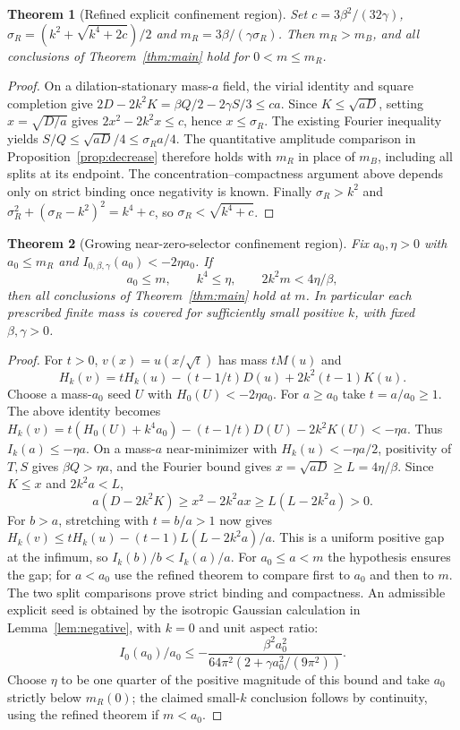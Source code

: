 \documentclass[11pt]{article}
\numberwithin{equation}{section}
\newtheorem{theorem}{Theorem}[section]
\theoremstyle{remark}
\begin{document}
\begin{theorem}[Refined explicit confinement region]
Set $c=3\beta^2/(32\gamma)$,
$\sigma_R=(k^2+\sqrt{k^4+2c})/2$ and
$m_R=3\beta/(\gamma\sigma_R)$. Then $m_R>m_B$, and all conclusions of
Theorem~\ref{thm:main} hold for $0<m\le m_R$.
\end{theorem}
\begin{proof}
On a dilation-stationary mass-$a$ field, the virial identity and square
completion give $2D-2k^2K=\beta Q/2-2\gamma S/3\le ca$.
Since $K\le\sqrt{aD}$, setting $x=\sqrt{D/a}$ gives
$2x^2-2k^2x\le c$, hence $x\le\sigma_R$.
The existing Fourier inequality yields
$S/Q\le\sqrt{aD}/4\le\sigma_R a/4$.
The quantitative amplitude comparison in
Proposition~\ref{prop:decrease} therefore holds with $m_R$ in place of
$m_B$, including all splits at its endpoint. The concentration--compactness
argument above depends only on strict binding once negativity is known.
Finally $\sigma_R>k^2$ and
$\sigma_R^2+(\sigma_R-k^2)^2=k^4+c$, so
$\sigma_R<\sqrt{k^4+c}$.
\end{proof}

\begin{theorem}[Growing near-zero-selector confinement region]
Fix $a_0,\eta>0$ with $a_0\le m_R$ and
$I_{0,\beta,\gamma}(a_0)<-2\eta a_0$. If
\[
a_0\le m,\qquad k^4\le\eta,\qquad 2k^2m<4\eta/\beta,
\]
then all conclusions of Theorem~\ref{thm:main} hold at $m$.
In particular each prescribed finite mass is covered for sufficiently
small positive $k$, with fixed $\beta,\gamma>0$.
\end{theorem}
\begin{proof}
For $t>0$, $v(x)=u(x/\sqrt t)$ has mass $tM(u)$ and
\[
H_k(v)=tH_k(u)-(t-1/t)D(u)+2k^2(t-1)K(u).
\]
Choose a mass-$a_0$ seed $U$ with $H_0(U)<-2\eta a_0$. For $a\ge a_0$
take $t=a/a_0\ge1$. The above identity becomes
$H_k(v)=t(H_0(U)+k^4a_0)-(t-1/t)D(U)-2k^2K(U)<-\eta a$.
Thus $I_k(a)\le-\eta a$.
On a mass-$a$ near-minimizer with $H_k(u)<-\eta a/2$, positivity of
$T,S$ gives $\beta Q>\eta a$, and the Fourier bound gives
$x=\sqrt{aD}\ge L=4\eta/\beta$. Since $K\le x$ and $2k^2a<L$,
\[
a(D-2k^2K)\ge x^2-2k^2ax\ge L(L-2k^2a)>0 .
\]
For $b>a$, stretching with $t=b/a>1$ now gives
$H_k(v)\le tH_k(u)-(t-1)L(L-2k^2a)/a$.
This is a uniform positive gap at the infimum, so $I_k(b)/b<I_k(a)/a$.
For $a_0\le a<m$ the hypothesis ensures the gap; for $a<a_0$ use
the refined theorem to compare first to $a_0$ and then to $m$.
The two split comparisons prove strict binding and compactness.
An admissible explicit seed is obtained by the isotropic Gaussian
calculation in Lemma~\ref{lem:negative}, with $k=0$ and unit aspect ratio:
\[
I_0(a_0)/a_0\le
-\frac{\beta^2a_0^2}{64\pi^2(2+\gamma a_0^2/(9\pi^2))}.
\]
Choose $\eta$ to be one quarter of the positive magnitude of this bound
and take $a_0$ strictly below $m_R(0)$; the claimed small-$k$ conclusion
follows by continuity, using the refined theorem if $m<a_0$.
\end{proof}
\end{document}
